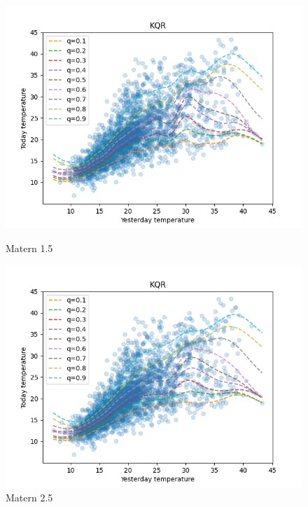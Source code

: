 \begin{figure}[!htp]
    \begin{minipage}[b]{0.5\linewidth}
      \centering
      \includegraphics[width=1.0\textwidth]{images/melbourne_matern_1.5_kernel_quantile_regression.png} 
        \caption{Matern 1.5} 
      \vspace{4ex}
    \end{minipage}%
    \begin{minipage}[b]{0.5\linewidth}
      \centering
      \includegraphics[width=1.0\textwidth]{images/melbourne_matern_2.5_kernel_quantile_regression.png}
      \caption{Matern 2.5} 
      \vspace{4ex}
    \end{minipage} 
    \begin{minipage}[b]{0.5\linewidth}

\end{minipage}
\end{figure}

